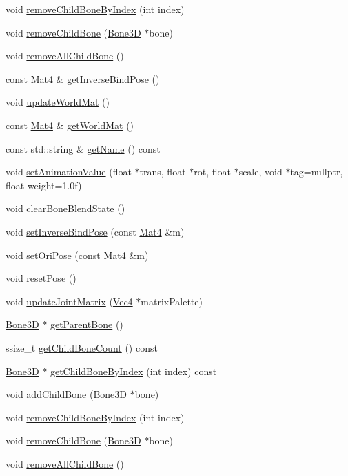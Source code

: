 \begin{DoxyCompactItemize}
void \hyperlink{classBone3D_a8ab61153ed7c8c90954346b6241e4e5c}{remove\+Child\+Bone\+By\+Index} (int index)
\item 
void \hyperlink{classBone3D_a384bcaace89faea2a5e61d7c172476f6}{remove\+Child\+Bone} (\hyperlink{classBone3D}{Bone3D} $\ast$bone)
\item 
void \hyperlink{classBone3D_add11919591bf6a849c848eca3a986289}{remove\+All\+Child\+Bone} ()
\item 
const \hyperlink{classMat4}{Mat4} \& \hyperlink{classBone3D_abeee6535e308b6057b1329b04f2a5b63}{get\+Inverse\+Bind\+Pose} ()
\item 
void \hyperlink{classBone3D_a9b804338ec06abeed0e6b50c8b17103a}{update\+World\+Mat} ()
\item 
const \hyperlink{classMat4}{Mat4} \& \hyperlink{classBone3D_a4027bb71e7e2ac272b57c582c9aa1158}{get\+World\+Mat} ()
\item 
const std\+::string \& \hyperlink{classBone3D_a013182c8e209ddf9282c7cb6e42d3d25}{get\+Name} () const
\item 
void \hyperlink{classBone3D_a70a3d6a845913aac7ac332e4e0eb5a3c}{set\+Animation\+Value} (float $\ast$trans, float $\ast$rot, float $\ast$scale, void $\ast$tag=nullptr, float weight=1.\+0f)
\item 
void \hyperlink{classBone3D_af2cf6d23bf2e4853ff944d7d4d0ed424}{clear\+Bone\+Blend\+State} ()
\item 
void \hyperlink{classBone3D_a30efff69c0378cc264db10c65fd8e18b}{set\+Inverse\+Bind\+Pose} (const \hyperlink{classMat4}{Mat4} \&m)
\item 
void \hyperlink{classBone3D_abd2362340c7ad200d2e1e6974d27dfce}{set\+Ori\+Pose} (const \hyperlink{classMat4}{Mat4} \&m)
\item 
void \hyperlink{classBone3D_af6fe8d8595d2ffa91b490de86ce6e3e2}{reset\+Pose} ()
\item 
void \hyperlink{classBone3D_aab877746976dc466bcc339845529b2e5}{update\+Joint\+Matrix} (\hyperlink{classVec4}{Vec4} $\ast$matrix\+Palette)
\item 
\hyperlink{classBone3D}{Bone3D} $\ast$ \hyperlink{classBone3D_a617a97bd81b8f81fd2e946e95d82be6b}{get\+Parent\+Bone} ()
\item 
ssize\+\_\+t \hyperlink{classBone3D_a5538e8f3e7f8af18e7183d673a2041d6}{get\+Child\+Bone\+Count} () const
\item 
\hyperlink{classBone3D}{Bone3D} $\ast$ \hyperlink{classBone3D_a92d362cde5c05727ed182ae254bdd946}{get\+Child\+Bone\+By\+Index} (int index) const
\item 
void \hyperlink{classBone3D_a666a91d8cb1bb98bd953144abe1385c5}{add\+Child\+Bone} (\hyperlink{classBone3D}{Bone3D} $\ast$bone)
\item 
void \hyperlink{classBone3D_a8ab61153ed7c8c90954346b6241e4e5c}{remove\+Child\+Bone\+By\+Index} (int index)
\item 
void \hyperlink{classBone3D_a384bcaace89faea2a5e61d7c172476f6}{remove\+Child\+Bone} (\hyperlink{classBone3D}{Bone3D} $\ast$bone)
\item 
void \hyperlink{classBone3D_add11919591bf6a849c848eca3a986289}{remove\+All\+Child\+Bone} ()
\end{DoxyCompactItemize}

